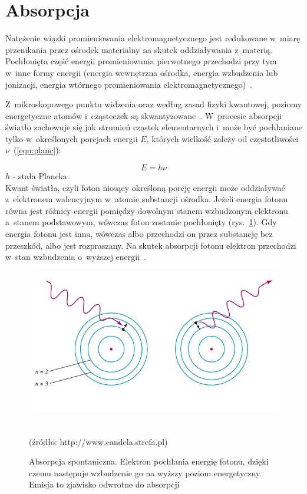 \section{Absorpcja}
\label{sec:Absorpcja}

Natężenie wiązki promieniowania elektromagnetycznego jest redukowane w~miarę przenikania przez ośrodek materialny na skutek 
oddziaływania z~materią. Pochłonięta część energii promieniowania pierwotnego przechodzi przy tym w~inne formy energii (energia wewnętrzna ośrodka, 
energia wzbudzenia lub jonizacji, energia wtórnego promieniowania elektromagnetycznego)~\cite{Feyn:2012}.

Z~mikroskopowego punktu widzenia oraz według zasad fizyki kwantowej, poziomy energetyczne atomów i~cząsteczek są skwantyzowane~\cite{Yavari:PhD:2006}.
W~procesie absorpcji światło zachowuje się jak strumień cząstek elementarnych i~może być pochłaniane tylko w~określonych porcjach energii $E$, których 
wielkość zależy od częstotliwości $\nu$~(\ref{equ:planc}):

\begin{equation}
	E = h\nu
\label{equ:planc}
\end{equation}
$h$ - stała Plancka.\\

Kwant światła, czyli foton niosący określoną porcję energii może oddziaływać z~elektronem walencyjnym w~atomie substancji ośrodka. Jeżeli 
energia fotonu równa jest różnicy energii pomiędzy dowolnym stanem wzbudzonym elektronu a~stanem podstawowym, wówczas foton zostanie pochłonięty 
(rys.~\ref{rys:absorption}). 
Gdy energia fotonu jest inna, wówczas albo przechodzi on przez substancję bez przeszkód, albo jest rozpraszany. Na skutek absorpcji fotonu elektron 
przechodzi w~stan wzbudzenia o~wyższej energii~\cite{Yavari:PhD:2006}.

\begin{figure}[ht]
	\centerline{\includegraphics[scale = 0.62]{graphic/absorption.jpg}}
	\caption{Absorpcja spontaniczna. Elektron pochłania energię fotonu, dzięki czemu następuje wzbudzenie go na wyższy poziom energetyczny. Emisja 
	 	 to zjawisko odwrotne do absorpcji}
	~\\
	(źródło: http://www.candela.strefa.pl) 
	\label{rys:absorption}
\end{figure}

